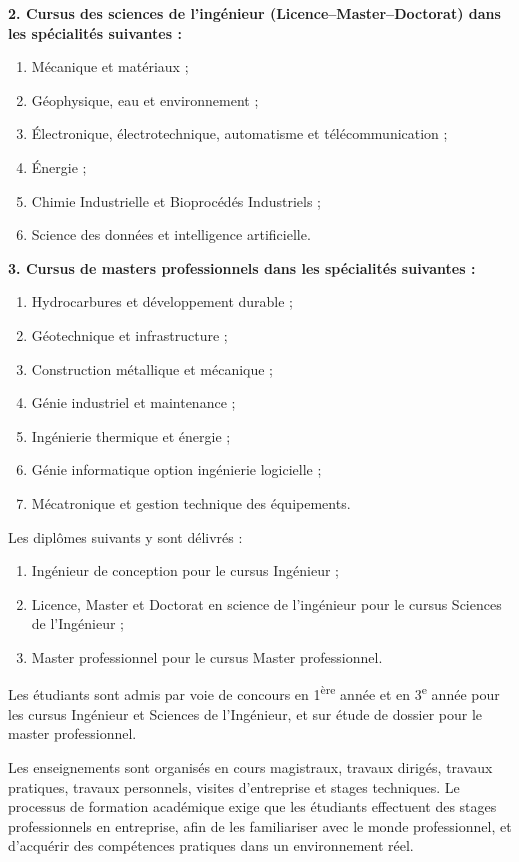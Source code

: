 \documentclass[a4paper,12pt,openany]{report}
\begin{document}
\textbf{2. Cursus des sciences de l’ingénieur (Licence–Master–Doctorat) dans les spécialités suivantes :}
\begin{enumerate}
 
	\item Mécanique et matériaux ;
	\item Géophysique, eau et environnement ;
	\item Électronique, électrotechnique, automatisme et télécommunication ;
	\item Énergie ;
	\item Chimie Industrielle et Bioprocédés Industriels ;
	\item Science des données et intelligence artificielle.
\end{enumerate}

\textbf{3. Cursus de masters professionnels dans les spécialités suivantes :}
\begin{enumerate}
	\item Hydrocarbures et développement durable ;
	\item Géotechnique et infrastructure ;
	\item Construction métallique et mécanique ;
	\item Génie industriel et maintenance ;
	\item Ingénierie thermique et énergie ;
	\item Génie informatique option ingénierie logicielle ;
	\item Mécatronique et gestion technique des équipements.
\end{enumerate}

Les diplômes suivants y sont délivrés :
\begin{enumerate}
	\item Ingénieur de conception pour le cursus Ingénieur ;
	\item Licence, Master et Doctorat en science de l’ingénieur pour le cursus Sciences de l’Ingénieur ;
	\item Master professionnel pour le cursus Master professionnel.
\end{enumerate}

Les étudiants sont admis par voie de concours en 1\textsuperscript{ère} année et en 3\textsuperscript{e} année pour les cursus Ingénieur et Sciences de l’Ingénieur, et sur étude de dossier pour le master professionnel.

Les enseignements sont organisés en cours magistraux, travaux dirigés, travaux pratiques, travaux personnels, visites d’entreprise et stages techniques. Le processus de formation académique exige que les étudiants effectuent des stages professionnels en entreprise, afin de les familiariser avec le monde professionnel, et d’acquérir des compétences pratiques dans un environnement réel.
\end{document}
